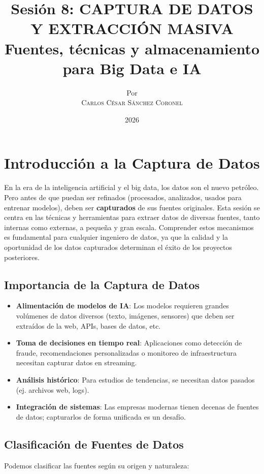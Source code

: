 \documentclass[12pt,a4paper,openany,oneside]{book}
\title{
    \Huge \textbf{Sesión 8: CAPTURA DE DATOS Y EXTRACCIÓN MASIVA} \\
    \large Fuentes, técnicas y almacenamiento para Big Data e IA
}
\author{
    \small Por \\ \vspace{0.2cm}
    \Large \textsc{Carlos César Sánchez Coronel}
}
\date{2026}
\begin{document}
\maketitle

\tableofcontents
{}

\chapter{Introducción a la Captura de Datos}
En la era de la inteligencia artificial y el big data, los datos son el nuevo petróleo. Pero antes de que puedan ser refinados (procesados, analizados, usados para entrenar modelos), deben ser \textbf{capturados} de sus fuentes originales. Esta sesión se centra en las técnicas y herramientas para extraer datos de diversas fuentes, tanto internas como externas, a pequeña y gran escala. Comprender estos mecanismos es fundamental para cualquier ingeniero de datos, ya que la calidad y la oportunidad de los datos capturados determinan el éxito de los proyectos posteriores.

\section{Importancia de la Captura de Datos}
\begin{itemize}
    \item \textbf{Alimentación de modelos de IA}: Los modelos requieren grandes volúmenes de datos diversos (texto, imágenes, sensores) que deben ser extraídos de la web, APIs, bases de datos, etc.
    \item \textbf{Toma de decisiones en tiempo real}: Aplicaciones como detección de fraude, recomendaciones personalizadas o monitoreo de infraestructura necesitan capturar datos en streaming.
    \item \textbf{Análisis histórico}: Para estudios de tendencias, se necesitan datos pasados (ej. archivos web, logs).
    \item \textbf{Integración de sistemas}: Las empresas modernas tienen decenas de fuentes de datos; capturarlos de forma unificada es un desafío.
\end{itemize}

\section{Clasificación de Fuentes de Datos}
Podemos clasificar las fuentes según su origen y naturaleza:
\end{document}
